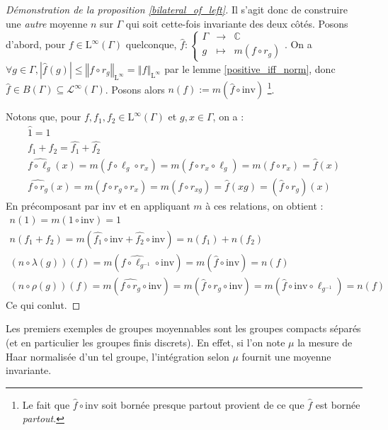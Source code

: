 \documentclass[a4paper,12pt]{article}
\newcommand{\C}{\mathbb{C}}
\newcommand{\norm}[1]{\left\Vert #1\right\Vert}
\newcommand{\abs}[1]{\left\vert#1\right\vert}
\newcommand\fundef[3]{#1: \left\{\begin{array}{ccc}#2\\#3\end{array}\right.}
\newcommand{\inv}{^{-1}}
\newcommand{\comp}{\circ}
\newcommand{\invop}{\mathrm{inv}}
\begin{document}
\begin{proof}[Démonstration de la proposition \ref{bilateral_of_left}]
    Il s'agit donc de construire une \emph{autre} moyenne $n$ sur $\Gamma$ qui soit cette-fois invariante des deux côtés.
    Posons d'abord, pour $f\in\mathrm{L}^\infty(\Gamma)$ quelconque, $\fundef{\widehat{f}}{\Gamma&\to&\C}{g&\mapsto&m(f\comp r_g)}$. On a 
    $\forall g\in\Gamma, \abs{\widehat{f}(g)} \le \norm{f\comp r_g}_{\mathrm{L}^\infty} = \norm{f}_{\mathrm{L}^\infty}$ par le lemme \ref{positive_iff_norm}, 
    donc $\widehat{f}\in B(\Gamma)\subseteq\mathscr{L}^\infty(\Gamma)$.
    Posons alors $n(f) := m\left(\widehat{f}\comp\invop\right)$
    \footnote{Le fait que $\widehat{f}\comp\invop$ soit bornée presque partout provient de ce que $\widehat{f}$ est bornée \emph{partout}.}.

    Notons que, pour $f, f_1, f_2\in\mathrm{L}^\infty(\Gamma)$ et $g, x\in\Gamma$, on a :
    \begin{gather*}
        \widehat{1} = 1 \\
        \widehat{f_1 + f_2} = \widehat{f_1} + \widehat{f_2} \\
        \widehat{f\comp\ell_g}(x) = m(f\comp\ell_g\comp r_x) = m(f\comp r_x\comp\ell_g) = m(f\comp r_x) = \widehat{f}(x) \\
        \widehat{f\comp r_g}(x) = m(f\comp r_g\comp r_x) = m(f\comp r_{xg}) = \widehat{f}(xg) = \left(\widehat{f}\comp r_g\right)(x)
    \end{gather*}
    En précomposant par $\invop$ et en appliquant $m$ à ces relations, on obtient :
    \begin{gather*}
        n(1) = m(1\comp\invop) = 1 \\
        n(f_1 + f_2) = m\left(\widehat{f_1}\comp\invop + \widehat{f_2}\comp\invop\right) = n(f_1) + n(f_2) \\
        (n\comp\lambda(g))(f) = m\left(\widehat{f\comp\ell_{g\inv}}\comp\invop\right) = m\left(\widehat{f}\comp\invop\right) = n(f) \\
        (n\comp\rho(g))(f) = m\left(\widehat{f\comp r_g}\comp\invop\right) = m\left(\widehat{f}\comp r_g\comp\invop\right) = m\left(\widehat{f}\comp \invop\comp\ell_{g\inv}\right) = n(f)
    \end{gather*}
    Ce qui conlut.
\end{proof}

Les premiers exemples de groupes moyennables sont les groupes compacts séparés (et en particulier les groupes finis discrets).
En effet, si l'on note $\mu$ la mesure de Haar normalisée d'un tel groupe, l'intégration selon $\mu$ fournit une moyenne invariante. 
\end{document}
